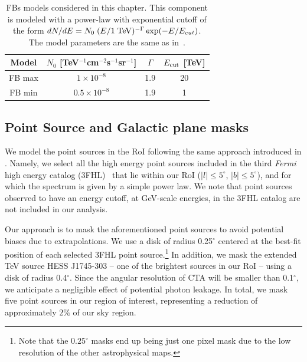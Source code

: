 \documentclass[doublespace,nopageskip]{VTthesis} %
\begin{document}
\begin{table}[htb]
\begin{center}
\caption{\label{tab:FBmodels}FBs models considered in this chapter. This component is modeled with a power-law with exponential cutoff of the form $dN/dE=N_0\; (E/{\rm 1\; TeV})^{-\Gamma}\exp(-E/{E_{cut}})$. The model parameters are the same as in~\citet{2021PhRvD.103b3011R}. 
}
\begin{tabular}{cccc}
\toprule
Model & $N_0$ [TeV$^{-1}$cm$^{-2}$s$^{-1}$sr$^{-1}$] & $\Gamma$ & $E_{\rm cut}$ [TeV]\\
\midrule
FB max & $1\times10^{-8}$ & 1.9 & 20\\
FB min & $0.5\times10^{-8}$ & 1.9 & 1\\
\bottomrule
\end{tabular}
\end{center}
\end{table}

\subsection{Point Source and Galactic plane masks}
\label{subsec:pointsources}

We model the point sources in the RoI following the same approach introduced in \cite{2021PhRvD.103b3011R}. Namely, we select all the high energy point sources included in the third {\it Fermi} high energy catalog (3FHL)~\citep{2017ApJS..232...18A} that lie within our RoI ($\lvert l \rvert \leq 5^\circ$, $\lvert b \rvert \leq 5^\circ$), and for which the spectrum is given by a simple power law. We note that point sources observed to have an energy cutoff, at GeV-scale energies, in the 3FHL catalog are not included in our analysis.


Our approach is to mask the aforementioned point sources to avoid potential biases due to extrapolations. We use a disk of radius 0.25$^\circ$ centered at the best-fit position of each selected 3FHL point source.\footnote{Note that the $0.25^\circ$ masks end up being just one pixel mask due to the low resolution of the other astrophysical maps.} 
In addition, we mask the extended TeV source HESS J1745-303 -- one of the brightest sources in our RoI --
using a disk of radius 0.4$^\circ$. Since the angular resolution of CTA will be smaller than 0.1$^\circ$, we anticipate a negligible effect of potential photon leakage. 
In total, we mask five point sources in our region of interest, representing a reduction of approximately $2\%$ of our sky region.
\end{document}
